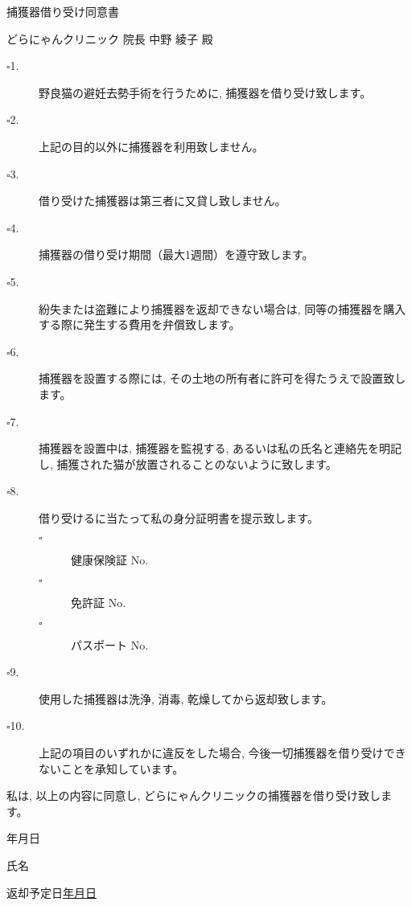 \documentclass{jsarticle}
\begin{document}
\begin{center}
\Huge
捕獲器借り受け同意書
\end{center}

\vspace{40pt}
\Large
\noindent どらにゃんクリニック	院長	中野	綾子	殿

\vspace{20pt}
\large

\begin{description}
  \item[$\square$1.] 野良猫の避妊去勢手術を行うために, 捕獲器を借り受け致します。
  \item[$\square$2.] 上記の目的以外に捕獲器を利用致しません。
  \item[$\square$3.] 借り受けた捕獲器は第三者に又貸し致しません。
  \item[$\square$4.] 捕獲器の借り受け期間（最大1週間）を遵守致します。
  \item[$\square$5.] 紛失または盗難により捕獲器を返却できない場合は, 同等の捕獲器を購入する際に発生する費用を弁償致します。
  \item[$\square$6.] 捕獲器を設置する際には, その土地の所有者に許可を得たうえで設置致します。
  \item[$\square$7.] 捕獲器を設置中は, 捕獲器を監視する, あるいは私の氏名と連絡先を明記し, 捕獲された猫が放置されることのないように致します。
  \item[$\square$8.] 借り受けるに当たって私の身分証明書を提示致します。
  \begin{description}
    \item[\small $\square$] \large 健康保険証 \small No.
    \item[$\square$] \large 免許証 \small No.
    \item[$\square$] \large パスポート \small No.
  \end{description}
  \item[$\square$9.] 使用した捕獲器は洗浄, 消毒, 乾燥してから返却致します。
  \item[$\square$10.]\hspace{-5pt}上記の項目のいずれかに違反をした場合, 今後一切捕獲器を借り受けできないことを承知しています。
\end{description}

\vspace{20pt}
私は, 以上の内容に同意し, どらにゃんクリニックの捕獲器を借り受け致します。

\vspace{120pt}
\begin{flushright}
年\hspace{40pt}月\hspace{40pt}日

\vspace{20pt}
氏名\underline{\hspace{205pt}}

\vspace{10pt}
返却予定日\underline{\hspace{60pt}年\hspace{40pt}月\hspace{40pt}日}
\end{flushright}
\end{document}
